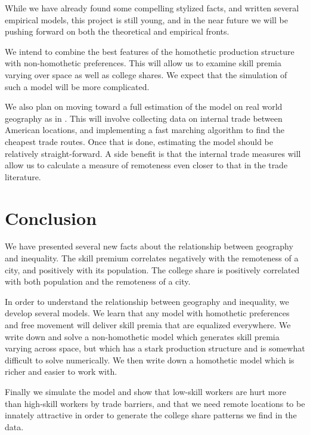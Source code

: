 \documentclass{article}
\begin{document}
While we have already found some compelling stylized facts, and written several empirical models, this project is still young, and in the near future we will be pushing forward on both the theoretical and empirical fronts.

We intend to combine the best features of the homothetic production structure with non-homothetic preferences.  This will allow us to examine skill premia varying over space as well as college shares.  We expect that the simulation of such a model will be more complicated.

We also plan on moving toward a full estimation of the model on real world geography as in \citet{allen2014trade}.  This will involve collecting data on internal trade between American locations, and implementing a fast marching algorithm to find the cheapest trade routes.  Once that is done, estimating the model should be relatively straight-forward.  A side benefit is that the internal trade measures will allow us to calculate a measure of remoteness even closer to that in the trade literature.

\section{Conclusion}

We have presented several new facts about the relationship between geography and inequality.  The skill premium correlates negatively with the remoteness of a city, and positively with its population.  The college share is positively correlated with both population and the remoteness of a city.

In order to understand the relationship between geography and inequality, we develop several models.  We learn that any model with homothetic preferences and free movement will deliver skill premia that are equalized everywhere.  We write down and solve a non-homothetic model which generates skill premia varying across space, but which has a stark production structure and is somewhat difficult to solve numerically.  We then write down a homothetic model which is richer and easier to work with.  

Finally we simulate the model and show that low-skill workers are hurt more than high-skill workers by trade barriers, and that we need remote locations to be innately attractive in order to generate the college share patterns we find in the data.

\newpage

\appendix
\end{document}
